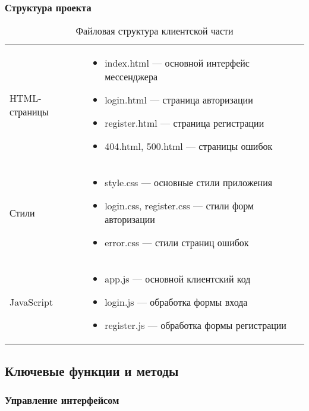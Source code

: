 \subsubsection{Структура проекта}
\begin{xltabular}{\textwidth}{|l|X|}
	\caption{Файловая структура клиентской части}\label{tab:project-structure} \\ \hline
	 &  \\ \hline 
	\endfirsthead
	
	HTML-страницы & 
	\begin{itemize}[leftmargin=*,nosep]
		\item index.html — основной интерфейс мессенджера
		\item login.html — страница авторизации
		\item register.html — страница регистрации
		\item 404.html, 500.html — страницы ошибок
	\end{itemize} \\ \hline
	
	Стили & 
	\begin{itemize}[leftmargin=*,nosep]
		\item style.css — основные стили приложения
		\item login.css, register.css — стили форм авторизации
		\item error.css — стили страниц ошибок
	\end{itemize} \\ \hline
	
	JavaScript & 
	\begin{itemize}[leftmargin=*,nosep]
		\item app.js — основной клиентский код 
		\item login.js — обработка формы входа
		\item register.js — обработка формы регистрации
	\end{itemize} \\ \hline
	
\end{xltabular}

\subsection{Ключевые функции и методы}

\subsubsection{Управление интерфейсом}

